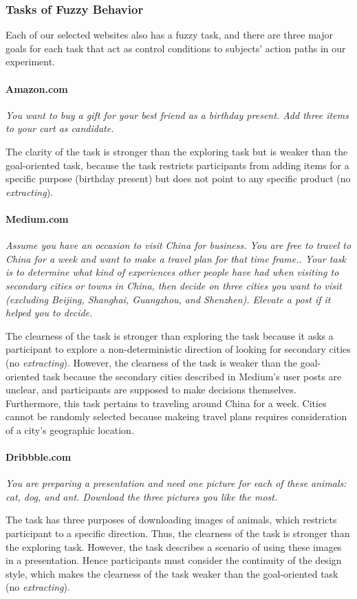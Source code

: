 \subsubsection{Tasks of Fuzzy Behavior}

Each of our selected websites also has a fuzzy task, and there are three major goals for each task that act
as control conditions to subjects' action paths in our experiment.

\paragraph{Amazon.com} \emph{You want to buy a gift for your best friend as a birthday present.
        Add three items to your cart as candidate.}

The clarity of the task is stronger than the exploring task but is weaker than 
the goal-oriented task, because
the task restricts participants from adding items for a specific purpose (birthday present) 
but does not point to any specific product (no \emph{extracting}).

\paragraph{Medium.com} \emph{Assume you have an occasion to visit China for business. 
        You are free to travel to China for a week and want to make a travel plan for that time frame.. 
        Your task is to determine what kind 
        of experiences other people have had when visiting to secondary cities or towns in China, then decide 
        on three cities you want to visit (excluding Beijing, Shanghai, Guangzhou, and Shenzhen). 
        Elevate a post if it helped you to decide.}

The clearness of the task is stronger than exploring the task because it asks a participant 
to explore a non-deterministic direction of looking for secondary cities (no \emph{extracting}).
However, the clearness of the task is weaker than the goal-oriented task because 
the secondary cities described in Medium's user posts are unclear, and participants are 
supposed to make decisions themselves.
Furthermore, this task pertains to traveling around  China for a week. 
Cities cannot be randomly
selected because makeing travel plans requires consideration of a city's geographic 
location.

\paragraph{Dribbble.com} \emph{You are preparing a presentation and need one picture for each of these animals: 
    cat, dog, and ant. Download the three pictures you like the most.}

The task has three purposes of downloading images of animals, which restricts participant to a specific direction.
Thus, the clearness of the task is stronger than the exploring task. 
However, the task describes a scenario of using
these images in a presentation. Hence participants must consider the continuity of 
the design style, which makes the clearness of the task weaker than 
the goal-oriented task (no \emph{extracting}).

\cleardoublepage